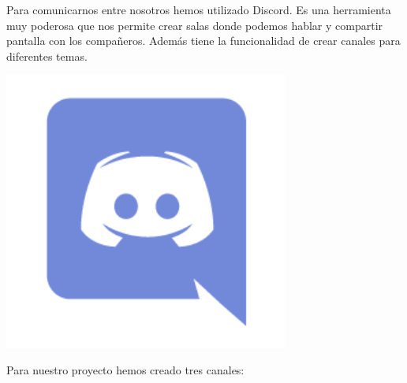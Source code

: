 \documentclass[12pt,a4paper]{article}
\begin{document}
\begin{minipage}{.75\textwidth}
Para comunicarnos entre nosotros hemos utilizado Discord. Es una herramienta muy poderosa que nos permite crear salas donde podemos hablar y compartir pantalla con los compañeros. Además tiene la funcionalidad de crear canales para diferentes temas.
\end{minipage} %
\begin{minipage}{.25\textwidth}
  \includegraphics[width=0.7\textwidth, right]{discord}
\end{minipage}


Para nuestro proyecto hemos creado tres canales:
 
\end{document}
